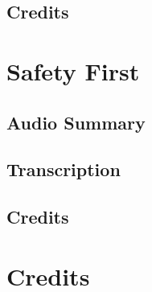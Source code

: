\subsection{Credits}

\section{Safety First}

\subsection{Audio Summary}

\subsection{Transcription}

\subsection{Credits}

\section{Credits}